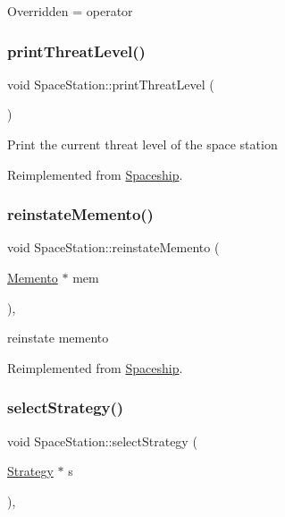 Overridden = operator \mbox{\label{classSpaceStation_a430ee680ac20af8245640e9271095688}} 
\subsubsection{\texorpdfstring{print\+Threat\+Level()}{printThreatLevel()}}
{\footnotesize\ttfamily void Space\+Station\+::print\+Threat\+Level (\begin{DoxyParamCaption}{ }\end{DoxyParamCaption})\hspace{0.3cm}{\ttfamily [virtual]}}

Print the current threat level of the space station 

Reimplemented from \hyperlink{classSpaceship_a8f16814f888a5a1423e5a491329cdb97}{Spaceship}.

\mbox{\label{classSpaceStation_a4d39ac0fe8f0aa521c32011f1a1bad9b}} 
\subsubsection{\texorpdfstring{reinstate\+Memento()}{reinstateMemento()}}
{\footnotesize\ttfamily void Space\+Station\+::reinstate\+Memento (\begin{DoxyParamCaption}\item[{\hyperlink{classMemento}{Memento} $\ast$}]{mem }\end{DoxyParamCaption})\hspace{0.3cm}{\ttfamily [inline]}, {\ttfamily [virtual]}}

reinstate memento 

Reimplemented from \hyperlink{classSpaceship_ab075c869473344b6471c8e28ca7ea61e}{Spaceship}.

\mbox{\label{classSpaceStation_adddfe90b720e2b0a8ce5d27a20eb204e}} 
\subsubsection{\texorpdfstring{select\+Strategy()}{selectStrategy()}}
{\footnotesize\ttfamily void Space\+Station\+::select\+Strategy (\begin{DoxyParamCaption}\item[{\hyperlink{classStrategy}{Strategy} $\ast$}]{s }\end{DoxyParamCaption})\hspace{0.3cm}{\ttfamily [inline]}, {\ttfamily [virtual]}}

